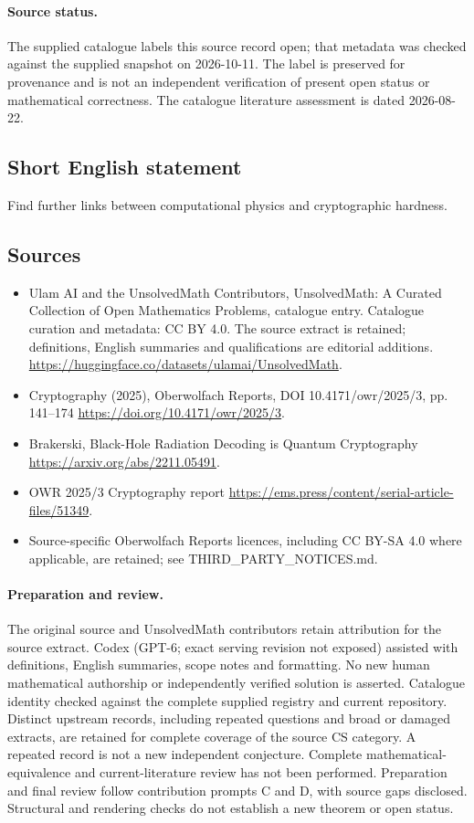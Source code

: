 \documentclass[11pt]{article}
\begin{document}
\paragraph{Source status.}
The supplied catalogue labels this source record open; that metadata was checked against the supplied snapshot on 2026-10-11. The label is preserved for provenance and is not an independent verification of present open status or mathematical correctness. The catalogue literature assessment is dated 2026-08-22.
\subsection{Short English statement}
Find further links between computational physics and cryptographic hardness.
\subsection{Sources}
\begin{itemize}
\item[S1] Ulam AI and the UnsolvedMath Contributors, UnsolvedMath: A Curated Collection of Open Mathematics Problems, catalogue entry. Catalogue curation and metadata: CC BY 4.0. The source extract is retained; definitions, English summaries and qualifications are editorial additions.
\url{https://huggingface.co/datasets/ulamai/UnsolvedMath}.
\item[S2] Cryptography (2025), Oberwolfach Reports, DOI 10.4171/owr/2025/3, pp. 141--174
\url{https://doi.org/10.4171/owr/2025/3}.
\item[S3] Brakerski, Black-Hole Radiation Decoding is Quantum Cryptography
\url{https://arxiv.org/abs/2211.05491}.
\item[S4] OWR 2025/3 Cryptography report
\url{https://ems.press/content/serial-article-files/51349}.
\item Source-specific Oberwolfach Reports licences, including CC BY-SA 4.0 where applicable, are retained; see THIRD\_PARTY\_NOTICES.md.
\end{itemize}
\paragraph{Preparation and review.}
The original source and UnsolvedMath contributors retain attribution for the source extract. Codex (GPT-6; exact serving revision not exposed) assisted with definitions, English summaries, scope notes and formatting. No new human mathematical authorship or independently verified solution is asserted. Catalogue identity checked against the complete supplied registry and current repository. Distinct upstream records, including repeated questions and broad or damaged extracts, are retained for complete coverage of the source CS category. A repeated record is not a new independent conjecture. Complete mathematical-equivalence and current-literature review has not been performed. Preparation and final review follow contribution prompts C and D, with source gaps disclosed. Structural and rendering checks do not establish a new theorem or open status.
\label{end:statement}
\end{document}
